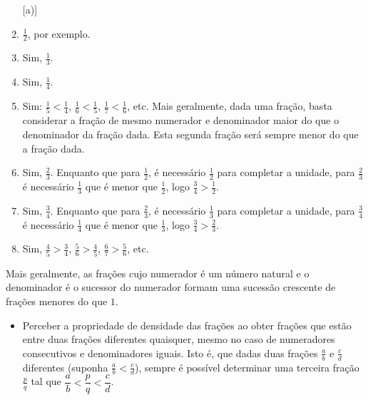 \begin{multicols}{2}
\begin{solucao}{}{}
\begin{enumerate} [\quad a)] %
    \item             $\frac{1}{2}$, por exemplo.
    \item       Sim,       $\frac{1}{3}$.
    \item       Sim,       $\frac{1}{4}$.
    \item       Sim:       $\frac{1}{5} < \frac{1}{4}$,       $\frac{1}{6} <
\frac{1}{5}$,       $\frac{1}{7} < \frac{1}{6}$, etc. Mais geralmente, dada uma
fração, basta considerar a fração de mesmo numerador e denominador maior do que
o denominador da fração dada. Esta segunda fração será sempre menor do que a
fração dada.
    \item       Sim,       $\frac{2}{3}$. Enquanto que para       $\frac{1}{2}$,
é necessário       $\frac{1}{2}$       para completar a unidade, para
$\frac{2}{3}$       é necessário       $\frac{1}{3}$       que é menor que
$\frac{1}{2}$, logo       $\frac{3}{4} > \frac{1}{2}$.
    \item       Sim,       $\frac{3}{4}$. Enquanto que para       $\frac{2}{3}$,
é necessário       $\frac{1}{3}$       para completar a unidade, para
$\frac{3}{4}$       é necessário       $\frac{1}{4}$       que é menor que
$\frac{1}{3}$, logo       $\frac{3}{4} > \frac{2}{3}$.
    \item       Sim,       $\frac{4}{5} > \frac{3}{4}$,       $\frac{5}{6} >
\frac{4}{5}$,       $\frac{6}{7} > \frac{5}{6}$, etc.
\end{enumerate} %

  Mais geralmente, as frações cujo numerador é um número natural e o denominador
é o sucessor do numerador formam uma sucessão crescente de frações menores do
que   $1$.

\end{solucao}

\end{multicols}

\begin{objetivos}[label=chap4-ativ25]{}{}
\begin{itemize} %
    \item       Perceber a propriedade de densidade das frações ao obter frações
que estão entre duas frações diferentes quaisquer, mesmo no caso de numeradores
consecutivos e denominadores iguais. Isto é, que dadas duas frações
$\frac{a}{b}$       e       $\frac{c}{d}$       diferentes (suponha
$\frac{a}{b}<\frac{c}{d}$), sempre é possível determinar uma terceira fração
  $\frac{p}{q}$       tal que       $\dfrac{a}{b}<\dfrac{p}{q}<\dfrac{c}{d}$.
\end{itemize} %
\end{objetivos}


